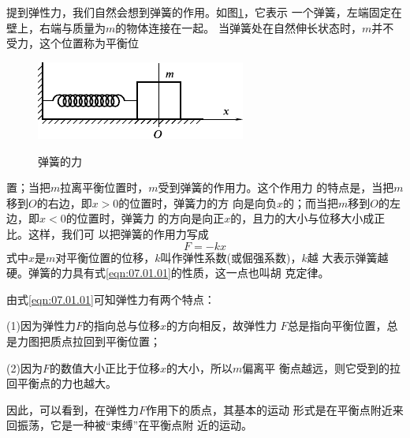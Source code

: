 \section[弹性力]{}\label{sec:07.01}

提到弹性力，我们自然会想到弹簧的作用。如图\ref{fig:07.01}，它表示
一个弹簧，左端固定在壁上，右端与质量为$ m $的物体连接在一起。
当弹簧处在自然伸长状态时，$ m $并不受力，这个位置称为平衡位
\begin{figure}
  \centering
  \includegraphics{figure/fig07.01}\\[1em]
  \caption{弹簧的力}
  \label{fig:07.01}
\end{figure}
置；当把$ m $拉离平衡位置时，$ m $受到弹簧的作用力。这个作用力
的特点是，当把$ m $移到$ O $的右边，即$ x > 0 $的位置时，弹簧力的方
向是向负$ x $的；而当把$ m $移到$ O $的左边，即$ x<0 $的位置时，弹簧力
的方向是向正$ x $的，且力的大小与位移大小成正比。这样，我们可
以把弹簧的作用力写成
\begin{equation}\label{eqn:07.01.01}
  F = - k x
\end{equation}
式中$ x $是$ m $对平衡位置的位移，$ k $叫作弹性系数(或倔强系数)，$ k $越
大表示弹簧越硬。弹簧的力具有式\eqref{eqn:07.01.01}的性质，这一点也叫胡
克定律。

由式\eqref{eqn:07.01.01}可知弹性力有两个特点：

(1)因为弹性力$ F $的指向总与位移$ x $的方向相反，故弹性力
$ F $总是指向平衡位置，总是力图把质点拉回到平衡位置；

(2)因为$ F $的数值大小正比于位移$ x $的大小，所以$ m $偏离平
衡点越远，则它受到的拉回平衡点的力也越大。

因此，可以看到，在弹性力$ F $作用下的质点，其基本的运动
形式是在平衡点附近来回振荡，它是一种被“束缚”在平衡点附
近的运动。

